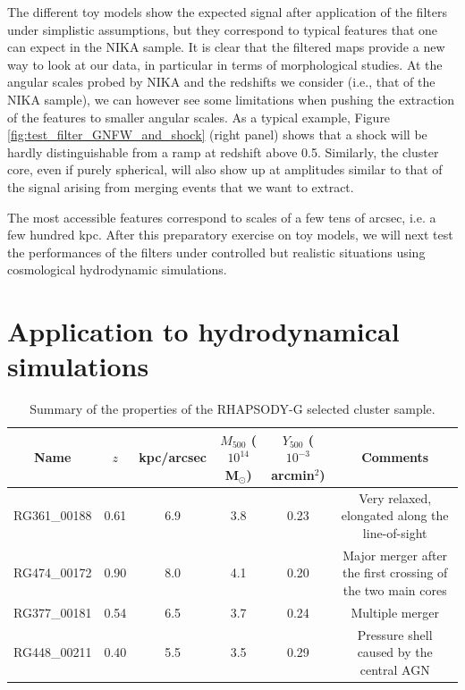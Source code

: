 \documentclass[twocolumn,traditabstract]{aa}
\begin{document}
The different toy models show the expected signal after application of the filters under simplistic assumptions, but they correspond to typical features that one can expect in the NIKA sample. It is clear that the filtered maps provide a new way to look at our data, in particular in terms of morphological studies. At the angular scales probed by NIKA and the redshifts we consider (i.e., that of the NIKA sample), we can however see some limitations when pushing the extraction of the features to smaller angular scales. As a typical example, Figure \ref{fig:test_filter_GNFW_and_shock} (right panel) shows that a shock will be hardly distinguishable from a ramp at redshift above 0.5. Similarly, the cluster core, even if purely spherical, will also show up at amplitudes similar to that of the signal arising from merging events that we want to extract. 

The most accessible features correspond to scales of a few tens of arcsec, i.e. a few hundred kpc. After this preparatory exercise on toy models, we will next test the performances of the filters under controlled but realistic situations using cosmological hydrodynamic simulations.

\section{Application to hydrodynamical simulations}\label{sec:Application_to_hydrodynamical_simulations}
\begin{table}[]
\caption{\footnotesize{Summary of the properties of the RHAPSODY-G selected cluster sample.}}
\begin{center}
\begin{tabular}{c|c|c|c|c|c}
\hline
\hline
Name & $z$ & kpc/arcsec & $M_{500}$ ($10^{14}$ M$_{\odot}$)& $Y_{500}$ ($10^{-3}$arcmin$^2$) & Comments \\
\hline
RG361\_00188 & 0.61 & 6.9 & 3.8 & 0.23 & Very relaxed, elongated along the line-of-sight \\ 
RG474\_00172 & 0.90 & 8.0 & 4.1 & 0.20 & Major merger after the first crossing of the two main cores \\ 
RG377\_00181 & 0.54 & 6.5 & 3.7 & 0.24 & Multiple merger \\
RG448\_00211 & 0.40 & 5.5 & 3.5 & 0.29 & Pressure shell caused by the central AGN \\ 
\hline
\end{tabular}
\end{center}
\label{tab:rhapsody_summary}
\end{table}
\end{document}
